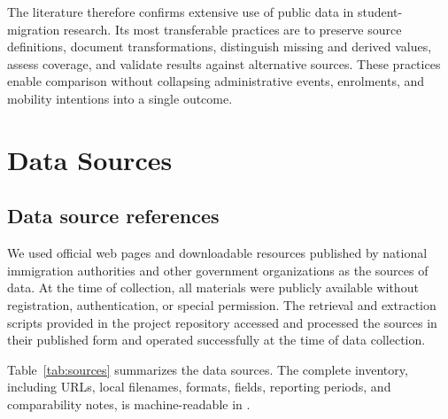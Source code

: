 \documentclass[runningheads]{llncs}
\newcommand{\file}[1]{\path{#1}}
\begin{document}
The literature therefore confirms extensive use of public data in student-migration research. Its most transferable practices are to preserve source definitions, document transformations, distinguish missing and derived values, assess coverage, and validate results against alternative sources. These practices enable comparison without collapsing administrative events, enrolments, and mobility intentions into a single outcome.

\section{Data Sources}

\subsection{Data source references}

We used official web pages and downloadable resources published by national immigration authorities and other government organizations as the sources of data. At the time of collection, all materials were publicly available without registration, authentication, or special permission. The retrieval and extraction scripts provided in the project repository accessed and processed the sources in their published form and operated successfully at the time of data collection.

Table~\ref{tab:sources} summarizes the data sources. The complete inventory, including URLs, local filenames, formats, fields, reporting periods, and comparability notes, is machine-readable in \file{data/country-schema.json}.
\end{document}
